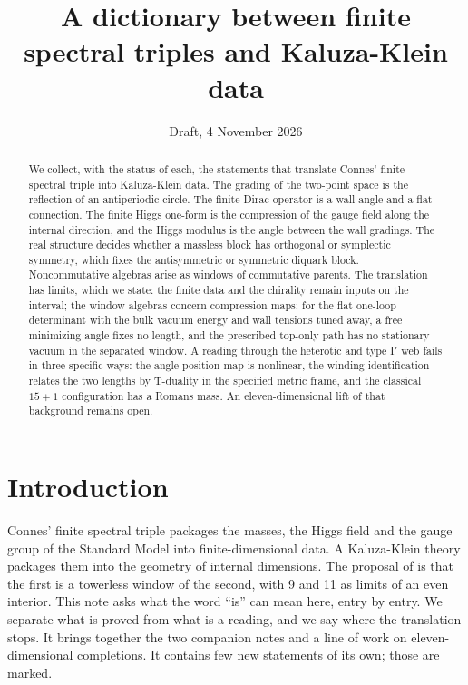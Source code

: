 \documentclass[aps,prd,reprint,onecolumn,nofootinbib,amsmath,amssymb,floatfix]{revtex4-2}
\theoremstyle{plain}
\begin{document}
\title{A dictionary between finite spectral triples and Kaluza-Klein data}
\date{Draft, 4 November 2026}

\begin{abstract}
We collect, with the status of each, the statements that translate Connes' finite spectral triple into Kaluza-Klein data. The grading of the two-point space is the reflection of an antiperiodic circle. The finite Dirac operator is a wall angle and a flat connection. The finite Higgs one-form is the compression of the gauge field along the internal direction, and the Higgs modulus is the angle between the wall gradings. The real structure decides whether a massless block has orthogonal or symplectic symmetry, which fixes the antisymmetric or symmetric diquark block. Noncommutative algebras arise as windows of commutative parents. The translation has limits, which we state: the finite data and the chirality remain inputs on the interval; the window algebras concern compression maps; for the flat one-loop determinant with the bulk vacuum energy and wall tensions tuned away, a free minimizing angle fixes no length, and the prescribed top-only path has no stationary vacuum in the separated window. A reading through the heterotic and type I$'$ web fails in three specific ways: the angle-position map is nonlinear, the winding identification relates the two lengths by T-duality in the specified metric frame, and the classical $15+1$ configuration has a Romans mass. An eleven-dimensional lift of that background remains open.
\end{abstract}

\maketitle

\section{Introduction}

Connes' finite spectral triple packages the masses, the Higgs field and the gauge group of the Standard Model into finite-dimensional data. A Kaluza-Klein theory packages them into the geometry of internal dimensions. The proposal of \cite{towerlesspaper} is that the first is a towerless window of the second, with 9 and 11 as limits of an even interior. This note asks what the word ``is'' can mean here, entry by entry. We separate what is proved from what is a reading, and we say where the translation stops. It brings together the two companion notes \cite{boundarynote,jointnote} and a line of work on eleven-dimensional completions. It contains few new statements of its own; those are marked.
\end{document}
